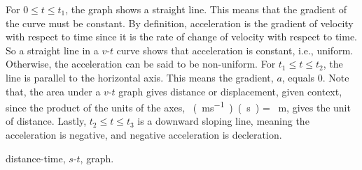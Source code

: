 For 
$0 \le t \le t_1$, the graph shows a straight line. This means that the gradient of the curve must
be constant. By definition, acceleration is the gradient of velocity with respect to time since
it is the rate of change of velocity with respect to time. So a straight line in a $v$-$t$ curve
shows that acceleration is constant, i.e., uniform. Otherwise, the acceleration can be said to be
non-uniform. For $t_1 \le t \le t_2$, the line is parallel to the horizontal axis. This means the
gradient, $a$, equals 0. Note that, the area under a $v$-$t$ graph gives distance or displacement,
given context, since the product of the units of the axes, \SI{}{(ms^{-1})(s)} = \SI{}{m}, gives
the unit of distance. Lastly, $t_2 \le t \le t_3$ is a downward sloping line, meaning the 
acceleration is negative, and negative acceleration is decleration.

\begin{center}

distance-time, $s$-$t$, graph.
\end{center}
